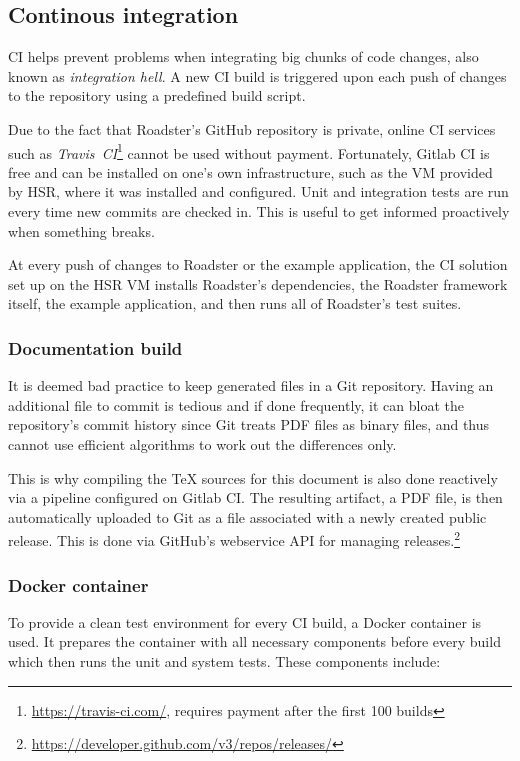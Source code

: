 \subsection{Continous integration}
\Gls{CI} helps prevent problems when integrating big chunks of code changes,
also known as \emph{integration hell}. A new CI build is triggered upon each
push of changes to the repository using a predefined build script.

Due to the fact that Roadster's GitHub repository is private, online \gls{CI}
services such as \emph{Travis~CI}\footnote{\url{https://travis-ci.com/}, requires payment after the
first 100 builds} cannot be used without payment. Fortunately,
Gitlab CI is free and can be installed on one's own infrastructure, such as the
\gls{VM} provided by HSR, where it was installed and configured. Unit and
integration tests are run every time new commits are checked in. This is useful
to get informed proactively when something breaks.

At every push of changes to Roadster or the example application, the CI
solution set up on the HSR VM installs Roadster's dependencies, the Roadster
framework itself, the example application, and then runs all of Roadster's test
suites.

\subsubsection{Documentation build}
It is deemed bad practice to keep generated files in a Git
repository. Having an additional file to commit is tedious and if done
frequently, it can bloat the repository's commit history since Git treats PDF
files as binary files, and thus cannot use efficient algorithms to work out the
differences only.

This is why compiling the TeX sources for this document is also done reactively
via a pipeline configured on Gitlab CI. The resulting artifact, a PDF file, is
then automatically uploaded to Git as a file associated with a newly created
public release. This is done via GitHub's webservice API for managing
releases.\footnote{\url{https://developer.github.com/v3/repos/releases/}}


\subsubsection{Docker container}
To provide a clean test environment for every CI build, a Docker container is used.
It prepares the container with all necessary components before every build
which then runs the unit and system tests. These components include:

